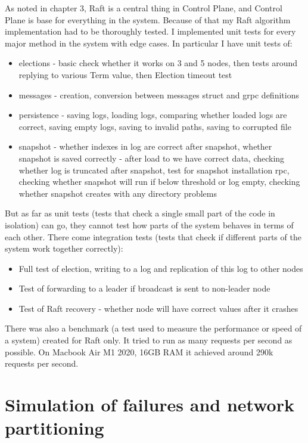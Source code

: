 \documentclass[shortabstract]{iithesis}
\begin{document}
As noted in chapter 3, Raft is a central thing in Control Plane, and Control Plane is base for everything in the system. Because of that my Raft algorithm implementation had to be thoroughly tested. I implemented unit tests for every major method in the system with edge cases. In particular I have unit tests of:
\begin{itemize}
    \item elections - basic check whether it works on 3 and 5 nodes, then tests around replying to various Term value, then Election timeout test 
    \item messages - creation, conversion between messages struct and grpc definitions 
    \item persistence - saving logs, loading logs, comparing whether loaded logs are correct, saving empty logs, saving to invalid paths, saving to corrupted file
    \item snapshot - whether indexes in log are correct after snapshot, whether snapshot is saved correctly - after load to we have correct data, checking whether log is truncated after snapshot, test for snapshot installation rpc, checking whether snapshot will run if below threshold or log empty, checking whether snapshot creates with any directory problems
\end{itemize}
\noindent But as far as unit tests (tests that check a single small part of the code in isolation) can go, they cannot test how parts of the system behaves in terms of each other. There come integration tests (tests that check if different parts of the system work together correctly):
\begin{itemize}
    \item Full test of election, writing to a log and replication of this log to other nodes
    \item Test of forwarding to a leader if broadcast is sent to non-leader node 
    \item Test of Raft recovery - whether node will have correct values after it crashes 
\end{itemize}

\noindent There was also a benchmark (a test used to measure the performance or speed of a system) created for Raft only. It tried to run as many requests per second as possible. On Macbook Air M1 2020, 16GB RAM it achieved around 290k requests per second.

\section{Simulation of failures and network partitioning}
\end{document}
